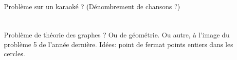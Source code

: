 \documentclass[a4paper,11pt]{article}
\begin{document}
\section{}

Problème sur un karaoké ? (Dénombrement de chansons ?)

\newpage

\section{}

Problème de théorie des graphes ? Ou de géométrie. Ou autre, à l'image du problème 5
de l'année dernière.
Idées: point de fermat
       points entiers dans les cercles.
       
























\end{document}
